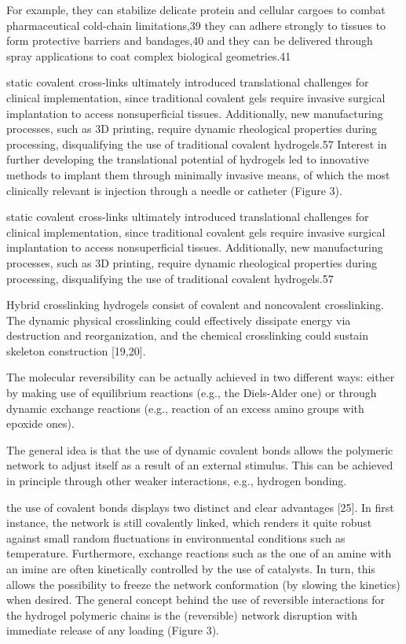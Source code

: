 For example, they can stabilize delicate protein and cellular cargoes to combat pharmaceutical  cold-chain limitations,39 they can adhere strongly to tissues to  form protective barriers and bandages,40 and they can be delivered through spray applications to coat complex biological  geometries.41

static covalent cross-links ultimately introduced translational challenges for clinical implementation, since traditional covalent gels require invasive surgical implantation to access nonsuperficial tissues.  
Additionally, new manufacturing processes, such as 3D printing, require dynamic rheological properties during processing, disqualifying the use of traditional covalent  hydrogels.57  
Interest in further developing the translational potential of hydrogels led to innovative methods to implant them through minimally invasive means, of which the most clinically relevant is injection through a needle or catheter (Figure 3).

static covalent cross-links ultimately introduced translational challenges for clinical implementation, since traditional covalent gels require invasive surgical implantation to access nonsuperficial tissues.  
Additionally, new manufacturing processes, such as 3D printing, require dynamic rheological properties during processing, disqualifying the use of traditional covalent  hydrogels.57



Hybrid crosslinking hydrogels consist of covalent and noncovalent crosslinking\citep{xuRoleChemicalPhysical2018}. 
The dynamic physical crosslinking could effectively dissipate energy via destruction and reorganization, and the chemical crosslinking could sustain skeleton construction [19,20]\citep{xuRoleChemicalPhysical2018}. 

The molecular reversibility can be actually achieved in two different ways: either by making use of equilibrium reactions (e.g., the Diels-Alder one) or through dynamic exchange reactions (e.g., reaction of an excess amino groups with epoxide ones)\citep{picchioniHydrogelsBasedDynamic2018}.

The general idea is that the use of dynamic covalent bonds allows the polymeric network to adjust itself as a result of an external stimulus\citep{picchioniHydrogelsBasedDynamic2018}. 
This can be achieved in principle through other weaker interactions, e.g., hydrogen bonding\citep{picchioniHydrogelsBasedDynamic2018}. 

the use of covalent bonds displays two distinct and clear advantages [25]. 
In first instance, the network is still covalently linked, which renders it quite robust against small random fluctuations in environmental conditions such as temperature. 
Furthermore, exchange reactions such as the one of an amine with an imine are often kinetically controlled by the use of catalysts. 
In turn, this allows the possibility to freeze the network conformation (by slowing the kinetics) when desired\citep{picchioniHydrogelsBasedDynamic2018}. 
The general concept behind the use of reversible interactions for the hydrogel polymeric chains is the (reversible) network disruption with immediate release of any loading (Figure 3).

